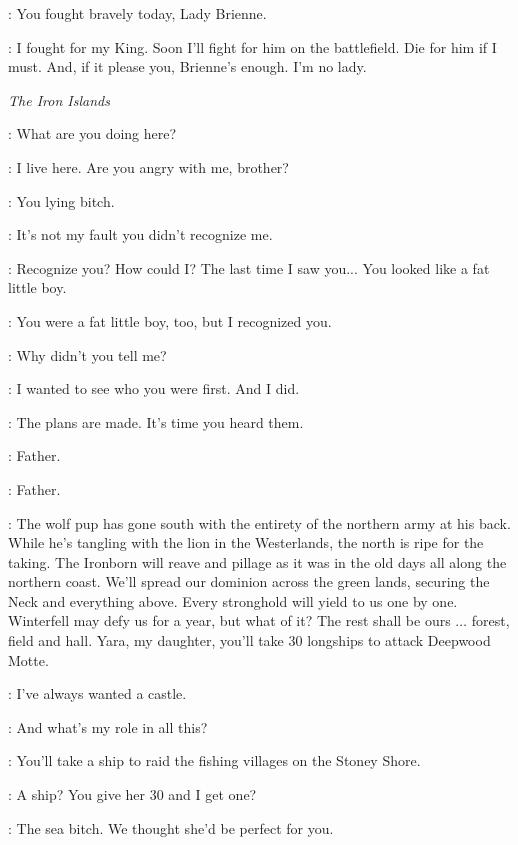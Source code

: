 \CATELYN: You fought bravely today, Lady Brienne. 

\BRIENNE: I fought for my King. Soon I'll fight for him on the battlefield. Die for him if I must. And, if it please you, Brienne's enough. I'm no lady. 


\scene

\textit{The Iron Islands} 


\THEON: What are you doing here? 

\YARA: I live here. Are you angry with me, brother? 

\THEON: You lying bitch. 

\YARA: It's not my fault you didn't recognize me. 

\THEON: Recognize you? How could I? The last time I saw you... You looked like a fat little boy. 

\YARA: You were a fat little boy, too, but I recognized you. 

\THEON: Why didn't you tell me? 

\YARA: I wanted to see who you were first. And I did. 


\BALON: The plans are made. It's time you heard them. 

\YARA: Father. 

\THEON: Father. 

\BALON: The wolf pup has gone south with the entirety of the northern army at his back. While he's tangling with the lion in the Westerlands, the north is ripe for the taking. The Ironborn will reave and pillage as it was in the old days all along the northern coast. We'll spread our dominion across the green lands, securing the Neck and everything above. Every stronghold will yield to us one by one. Winterfell may defy us for a year, but what of it? The rest shall be ours $\ldots$ forest, field and hall. Yara, my daughter, you'll take 30 longships to attack Deepwood Motte. 

\YARA: I've always wanted a castle. 

\THEON: And what's my role in all this? 

\BALON: You'll take a ship to raid the fishing villages on the Stoney Shore. 

\THEON: A ship? You give her 30 and I get one? 

\YARA: The sea bitch. We thought she'd be perfect for you. 

